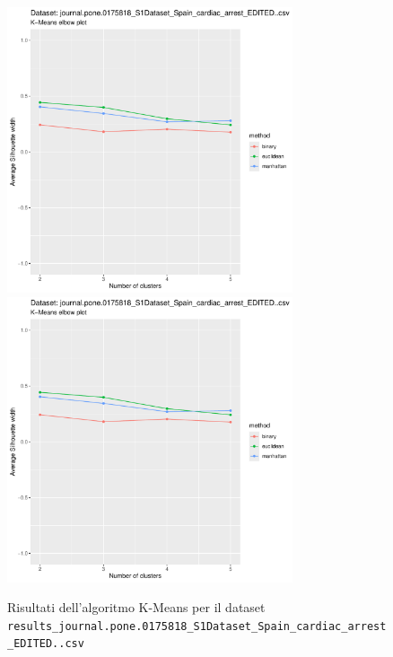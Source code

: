 \documentclass[12pt]{report}
\begin{document}
			\begin{figure}[h]
				\centering
				\includegraphics[width = 0.75\textwidth, height = 0.45\textheight, page = 1]{
					results/results_journal.pone.0175818_S1Dataset_Spain_cardiac_arrest_EDITED..csv.pdf
				}
				\includegraphics[width = 0.75\textwidth, height = 0.45\textheight, page = 2]{
					results/results_journal.pone.0175818_S1Dataset_Spain_cardiac_arrest_EDITED..csv.pdf
				}
				\caption{Risultati dell'algoritmo K-Means per il dataset
				\texttt{results\_journal.pone.0175818\_S1Dataset\_Spain\_cardiac\_arrest\_EDITED..csv}}
				\label{fig:kmeans2}
			\end{figure}
\end{document}
